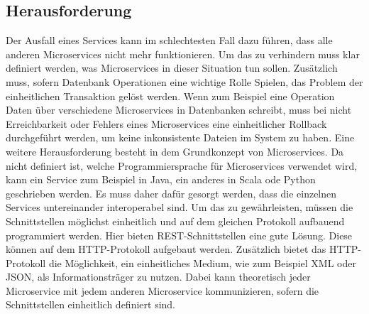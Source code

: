 \subsection{Herausforderung}
\label{sec:Herausforderung}
Der Ausfall eines Services kann im schlechtesten Fall dazu führen, dass alle anderen Microservices nicht mehr funktionieren. Um das zu verhindern muss klar definiert werden, was Microservices in dieser Situation tun sollen. Zusätzlich muss, sofern Datenbank Operationen eine wichtige Rolle Spielen, das Problem der einheitlichen Transaktion gelöst werden. Wenn zum Beispiel eine Operation Daten über verschiedene Microservices in Datenbanken schreibt, muss bei nicht Erreichbarkeit oder Fehlers eines Microservices eine einheitlicher Rollback durchgeführt werden, um keine inkonsistente Dateien im System zu haben.
Eine weitere Herausforderung besteht in dem Grundkonzept von Microservices. Da nicht definiert ist, welche Programmiersprache für Microservices verwendet wird, kann ein Service zum Beispiel in Java, ein anderes in Scala ode Python geschrieben werden. Es muss daher dafür gesorgt werden, dass die einzelnen Services untereinander interoperabel sind. Um das zu gewährleisten, müssen die Schnittstellen möglichst einheitlich und auf dem gleichen Protokoll aufbauend programmiert werden. Hier bieten REST-Schnittstellen eine gute Lösung. Diese können auf dem HTTP-Protokoll aufgebaut werden. Zusätzlich bietet das HTTP-Protokoll die Möglichkeit, ein einheitliches Medium, wie zum Beispiel XML oder JSON, als Informationsträger zu nutzen. Dabei kann theoretisch jeder Microservice mit jedem anderen Microservice kommunizieren, sofern die Schnittstellen einheitlich definiert sind.

